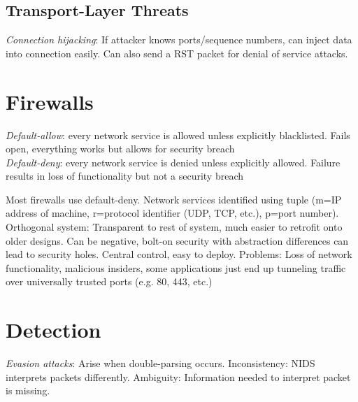 \documentclass[10pt,landscape]{article}
\begin{document}
\begin{multicols}{3}
\subsection{Transport-Layer Threats}

\textit{Connection hijacking}: If attacker knows ports/sequence numbers, can inject data into connection easily. Can also send a RST packet for denial of service attacks.


\section{Firewalls}

\textit{Default-allow}: every network service is allowed unless explicitly blacklisted. Fails open, everything works but allows for security breach \\
\textit{Default-deny}: every network service is denied unless explicitly allowed. Failure results in loss of functionality but not a security breach

Most firewalls use default-deny. Network services identified using tuple (m=IP address of machine, r=protocol identifier (UDP, TCP, etc.), p=port number). Orthogonal system: Transparent to rest of system, much easier to retrofit onto older designs. Can be negative, bolt-on security with abstraction differences can lead to security holes. Central control, easy to deploy. Problems: Loss of network functionality, malicious insiders, some applications just end up tunneling traffic over universally trusted ports (e.g. 80, 443, etc.)


\section{Detection}

\textit{Evasion attacks}: Arise when double-parsing occurs. Inconsistency: NIDS interprets packets differently. Ambiguity: Information needed to interpret packet is missing.


\end{multicols}
\end{document}

